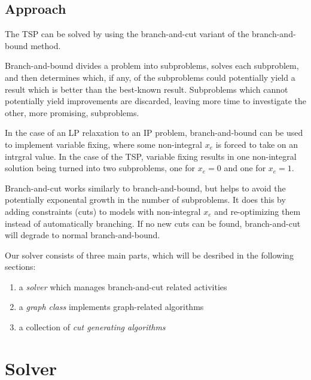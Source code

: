 \documentclass{article}
\begin{document}
\subsection{Approach}

The TSP can be solved
by using the branch-and-cut variant
of the branch-and-bound method.

Branch-and-bound divides a problem into subproblems,
solves each subproblem,
and then determines which, if any, of the subproblems
could potentially yield a result
which is better than the best-known result.
Subproblems which cannot potentially yield improvements are discarded,
leaving more time to investigate the other, more promising, subproblems.

In the case of an LP relaxation to an IP problem,
branch-and-bound can be used to implement variable fixing,
where some non-integral $x_e$ is forced to take on an intrgral value.
In the case of the TSP, variable fixing results
in one non-integral solution
being turned into two subproblems,
one for $x_e = 0$ and one for $x_e = 1$.

Branch-and-cut works similarly to branch-and-bound,
but helps to avoid the potentially exponental growth
in the number of subproblems.  It does this by adding
constraints (cuts) to models with non-integral $x_e$
and re-optimizing them instead of automatically branching.
If no new cuts can be found,
branch-and-cut will degrade to normal branch-and-bound.

Our solver consists of three main parts, which will be desribed in the following sections:
\begin{enumerate}
\item a \textit{solver} which manages branch-and-cut related activities
\item a \textit{graph class} implements graph-related algorithms
\item a collection of \textit{cut generating algorithms}
\end{enumerate}

\section{Solver}
\end{document}
